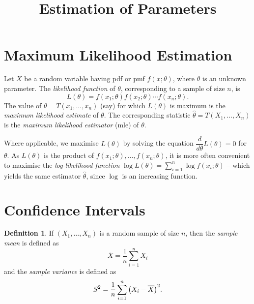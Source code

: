\documentclass[svgnames, a5paper]{article}
\theoremstyle{definition}
\newtheorem{Definition}[Theorem]{Definition}
\theoremstyle{remark}
\begin{document}
\title{\textbf{Estimation of Parameters}}

\date{}
\maketitle


\section{Maximum Likelihood Estimation}\label{sec:MLE}

Let $X$ be a random variable having pdf or pmf $f(x; \theta)$, where $\theta$ is an unknown parameter. The \emph{likelihood function} of $\theta$, corresponding to a sample of size $n$, is
\begin{equation*}
L(\theta) = f(x_1; \theta) f(x_2; \theta) \cdots f(x_n; \theta).
\end{equation*}
The value of $\theta = T(x_1, \ldots, x_n)$ (say) for which $L(\theta)$ is maximum is the \emph{maximum likelihood estimate} of $\theta$. The corresponding statistic $\hat\theta = T(X_1, \ldots, X_n)$ is the \emph{maximum likelihood estimator} (mle) of $\theta$.

Where applicable, we maximise $L(\theta)$ by solving the equation $\dfrac{d}{d\theta} L(\theta) = 0$ for $\theta$. As $L(\theta)$ is the product of $f(x_1; \theta), \ldots, f(x_n; \theta)$, it is more often convenient to maximise the \emph{log-likelihood function} $\log L(\theta) = \sum_{i=1}^{n} \log f(x_i; \theta)$ -- which yields the same estimator $\hat\theta$, since $\log$ is an increasing function.

\section{Confidence Intervals}\label{sec:CI}

\begin{Definition}
If $(X_1, \ldots, X_n)$ is a random sample of size $n$, then the \emph{sample mean} is defined as
\begin{equation*}
\overline X = \dfrac 1 n \sum_{i = 1}^n X_i
\end{equation*}
and the \emph{sample variance} is defined as
\begin{equation*}
S^2 = \dfrac 1 n \sum_{i = 1}^n \pqty{X_i - \overline X}^2.
\end{equation*}
\end{Definition}
\end{document}
